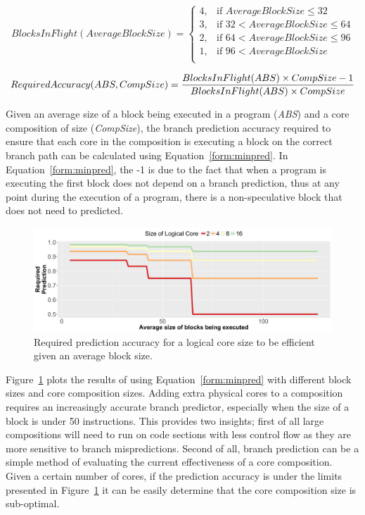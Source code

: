 \begin{equation}\label{form:blocks}
BlocksInFlight(AverageBlockSize) = \begin{cases}
4, &\text{if } AverageBlockSize \le 32 \\
3, &\text{if } 32 < AverageBlockSize \le 64 \\
2, &\text{if } 64 < AverageBlockSize \le 96\\
1, &\text{if } 96 < AverageBlockSize\\
\end{cases}
\end{equation}

\begin{equation}\label{form:minpred}
RequiredAccuracy(ABS,CompSize)= \frac{BlocksInFlight(ABS) \times CompSize- 1}{BlocksInFlight(ABS) \times CompSize}
\vspace{1em}
\end{equation}


Given an average size of a block being executed in a program (\textit{ABS}) and a core composition of size (\textit{CompSize}), the branch prediction accuracy required to ensure that each core in the composition is executing a block on the correct branch path can be calculated using Equation~\ref{form:minpred}.
In Equation~\ref{form:minpred}, the -1 is due to the fact that when a program is executing the first block does not depend on a branch prediction, thus at any point during the execution of a program, there is a non-speculative block that does not need to predicted.

\begin{figure}[t]
    \centering
    \includegraphics[width=\textwidth]{cases-paper/graphics/limit_study/prediction_req.pdf}
    \caption{Required prediction accuracy for a logical core size to be efficient given an average block size.}
    \label{fig:req_pred}
	\vspace{1em}
\end{figure}
Figure~\ref{fig:req_pred} plots the results of using Equation~\ref{form:minpred} with different block sizes and core composition sizes.
Adding extra physical cores to a composition requires an increasingly accurate branch predictor, especially when the size of a block is under 50 instructions.
This provides two insights; first of all large compositions will need to run on code sections with less control flow as they are more sensitive to branch mispredictions.
Second of all, branch prediction can be a simple method of evaluating the current effectiveness of a core composition.
Given a certain number of cores, if the prediction accuracy is under the limits presented in Figure~\ref{fig:req_pred} it can be easily determine that the core composition size is sub-optimal.

